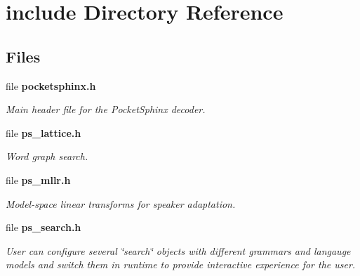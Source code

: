 \section{include Directory Reference}
\label{dir_d44c64559bbebec7f509842c48db8b23}
\subsection*{Files}
\begin{DoxyCompactItemize}
\item 
file \textbf{ pocketsphinx.\+h}
\begin{DoxyCompactList}\small\item\em Main header file for the Pocket\+Sphinx decoder. \end{DoxyCompactList}\item 
file \textbf{ ps\+\_\+lattice.\+h}
\begin{DoxyCompactList}\small\item\em Word graph search. \end{DoxyCompactList}\item 
file \textbf{ ps\+\_\+mllr.\+h}
\begin{DoxyCompactList}\small\item\em Model-\/space linear transforms for speaker adaptation. \end{DoxyCompactList}\item 
file \textbf{ ps\+\_\+search.\+h}
\begin{DoxyCompactList}\small\item\em User can configure several \char`\"{}search\char`\"{} objects with different grammars and langauge models and switch them in runtime to provide interactive experience for the user. \end{DoxyCompactList}\end{DoxyCompactItemize}
